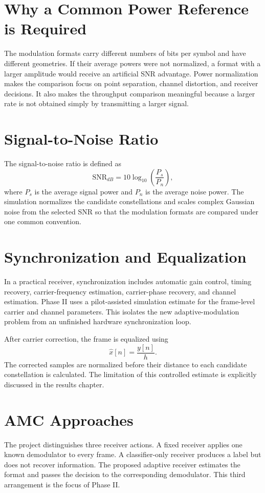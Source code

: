 \documentclass[12pt,twoside,openright]{report}
\begin{document}
\section{Why a Common Power Reference is Required}
The modulation formats carry different numbers of bits per symbol and have
different geometries. If their average powers were not normalized, a
format with a larger amplitude would receive an artificial SNR advantage.
Power normalization makes the comparison focus on point separation,
channel distortion, and receiver decisions. It also makes the throughput
comparison meaningful because a larger rate is not obtained simply by
transmitting a larger signal.

\section{Signal-to-Noise Ratio}
The signal-to-noise ratio is defined as
\begin{equation}
\mathrm{SNR}_{dB}=10\log_{10}\left(\frac{P_s}{P_n}\right),
\end{equation}
where $P_s$ is the average signal power and $P_n$ is the average noise
power. The simulation normalizes the candidate constellations and scales
complex Gaussian noise from the selected SNR so that the modulation formats
are compared under one common convention.

\section{Synchronization and Equalization}
In a practical receiver, synchronization includes automatic gain control,
timing recovery, carrier-frequency estimation, carrier-phase recovery, and
channel estimation. Phase II uses a pilot-assisted simulation estimate for
the frame-level carrier and channel parameters. This isolates the new
adaptive-modulation problem from an unfinished hardware synchronization loop.

After carrier correction, the frame is equalized using
\begin{equation}
\hat{x}[n]=\frac{y[n]}{h}.
\end{equation}
The corrected samples are normalized before their distance to each candidate
constellation is calculated. The limitation of this controlled estimate is
explicitly discussed in the results chapter.

\section{AMC Approaches}
The project distinguishes three receiver actions. A fixed receiver applies
one known demodulator to every frame. A classifier-only receiver produces a
label but does not recover information. The proposed adaptive receiver
estimates the format and passes the decision to the corresponding
demodulator. This third arrangement is the focus of Phase II.
\end{document}
